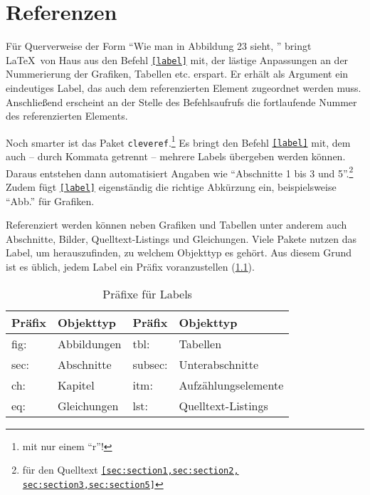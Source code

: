 \chapter{Referenzen}
\label{sec:references}

Für Querverweise der Form \enquote{Wie man in Abbildung 23 sieht, \textellipsis} bringt \LaTeX\ von Haus aus den Befehl \texttt{\ref{label}} mit, der lästige Anpassungen an der Nummerierung der Grafiken, Tabellen etc. erspart.
Er erhält als Argument ein eindeutiges Label, das auch dem referenzierten Element zugeordnet werden muss.
Anschließend erscheint an der Stelle des Befehlsaufrufs die fortlaufende Nummer des referenzierten Elements.


Noch smarter ist das Paket \texttt{cleveref}.\footnote{mit nur einem \enquote{r}!}
Es bringt den Befehl \texttt{\cref{label}} mit, dem auch -- durch Kommata getrennt -- mehrere Labels übergeben werden können.
Daraus entstehen dann automatisiert Angaben wie \enquote{Abschnitte 1 bis 3 und 5}.\footnote{für den Quelltext \texttt{\cref{sec:section1,sec:section2,
sec:section3,sec:section5}}}
Zudem fügt \texttt{\cref{label}} eigenständig die richtige Abkürzung ein, beispielsweise \enquote{Abb.} für Grafiken.

Referenziert werden können neben Grafiken und Tabellen unter anderem auch Abschnitte, Bilder, Quelltext-Listings und Gleichungen.
Viele Pakete nutzen das Label, um herauszufinden, zu welchem Objekttyp es gehört.
Aus diesem Grund ist es üblich, jedem Label ein Präfix voranzustellen (\cref{lst:reference-prefixes}).

\begin{table}[H]
  \centering
  \begin{tabular}{@{}llll@{}}
    \toprule
    Präfix & Objekttyp & Präfix & Objekttyp \\ \midrule
    fig: & Abbildungen & tbl:    & Tabellen            \\ 
    sec: & Abschnitte  & subsec: & Unterabschnitte     \\
    ch:  & Kapitel     & itm:    & Aufzählungselemente \\
    eq:  & Gleichungen & lst:    & Quelltext-Listings  \\ \bottomrule
  \end{tabular}
  \caption{Präfixe für Labels}
  \label{lst:reference-prefixes}
\end{table}

